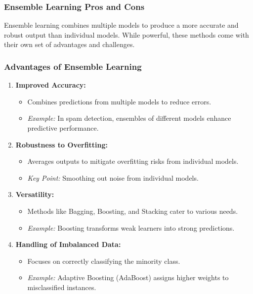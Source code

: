 \documentclass[aspectratio=169]{beamer}
\begin{document}
\begin{frame}[fragile]
  \frametitle{Ensemble Learning Pros and Cons}
  Ensemble learning combines multiple models to produce a more accurate and robust output than individual models. While powerful, these methods come with their own set of advantages and challenges.
\end{frame}

\begin{frame}[fragile]
  \frametitle{Advantages of Ensemble Learning}
  \begin{enumerate}
    \item \textbf{Improved Accuracy:}
    \begin{itemize}
      \item Combines predictions from multiple models to reduce errors.
      \item \textit{Example:} In spam detection, ensembles of different models enhance predictive performance.
    \end{itemize}

    \item \textbf{Robustness to Overfitting:}
    \begin{itemize}
      \item Averages outputs to mitigate overfitting risks from individual models.
      \item \textit{Key Point:} Smoothing out noise from individual models.
    \end{itemize}

    \item \textbf{Versatility:}
    \begin{itemize}
      \item Methods like Bagging, Boosting, and Stacking cater to various needs.
      \item \textit{Example:} Boosting transforms weak learners into strong predictions.
    \end{itemize}

    \item \textbf{Handling of Imbalanced Data:}
    \begin{itemize}
      \item Focuses on correctly classifying the minority class.
      \item \textit{Example:} Adaptive Boosting (AdaBoost) assigns higher weights to misclassified instances.
    \end{itemize}
  \end{enumerate}
\end{frame}
\end{document}
